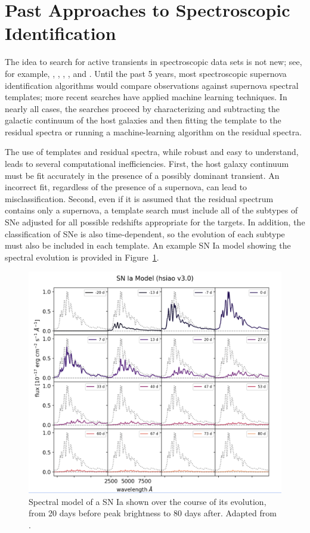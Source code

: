 \section{Past Approaches to Spectroscopic Identification}
\label{sec:PrevApproach}


%
The idea to search for active transients in spectroscopic data sets is not new; see, for example, \textcite{Madgwick2003}, \textcite{Graur2013}, \textcite{Baron2017}, \textcite{Muthukrishna2019}, and \textcite{Davison2022}.
%
Until the past 5 years, most spectroscopic supernova identification algorithms would compare observations against supernova spectral templates; more recent searches have applied machine learning techniques. In nearly all cases, the searches proceed by characterizing and subtracting the galactic continuum of the host galaxies and then fitting the template to the residual spectra or running a machine-learning algorithm on the residual spectra.

The use of templates and residual spectra, while robust and easy to understand, leads to several computational inefficiencies. First, the host galaxy continuum must be fit accurately in the presence of a possibly dominant transient. An incorrect fit, 
regardless of the presence of a supernova, can lead to misclassification. Second, even if 
it is assumed that the residual spectrum contains only a supernova, a template search must include all of the subtypes of 
SNe adjusted for all possible redshifts appropriate for the targets. In addition, the classification of 
SNe is also time-dependent, so the evolution of each subtype must also be included in each template. An 
example SN Ia model showing the spectral evolution is provided in Figure~\ref{fig:sne_template}.

\begin{figure}[t]
    \centering
    \includegraphics[width=.8\textwidth]{figures/desi_figures/snia_templates.png}
    \caption[Spectral Template of SN Ia SNe]{Spectral model of a SN Ia shown over the course of its evolution, from 20 days before peak brightness to 80 days after. Adapted from \textcite{DESIpresentation}.}
    \label{fig:sne_template}
\end{figure}

